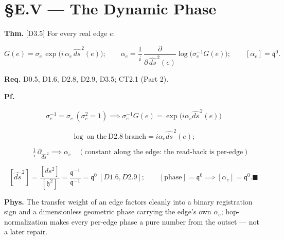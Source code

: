 \section[§E.V — The Dynamic Phase]{\texorpdfstring{§E.V — The Dynamic Phase}{SE.V - The Dynamic Phase}}

\begin{theorem}\label{tag:EM-16}
\textbf{Thm.} [D3.5] For every real edge $e$:

\[
G(e)=\sigma_e\,\exp\!\bigl(i\,\alpha_e\,\widehat{ds}^{\,2}(e)\bigr);\qquad
\alpha_e=\frac1i\,\frac{\partial}{\partial\,\widehat{ds}^{\,2}(e)}\log\!\bigl(\sigma_e^{-1}G(e)\bigr);\qquad
[\alpha_e]=\mathfrak q^{0}.
\]

\textbf{Req.} D0.5, D1.6, D2.8, D2.9, D3.5; CT2.1 (Part 2).

\textbf{Pf.}

\[
\sigma_e^{-1}=\sigma_e\ (\sigma_e^2=1)\implies\sigma_e^{-1}G(e)=\exp\bigl(i\alpha_e\widehat{ds}^{\,2}(e)\bigr)
\]

\[
\log\ \text{on the}\ \mathrm{D2.8}\ \text{branch}=i\alpha_e\widehat{ds}^{\,2}(e);
\]

\[
\qquad \tfrac1i\,\partial_{\widehat{ds}^{\,2}}\implies\alpha_e\quad(\text{constant along the edge: the read-back is per-edge})
\]

\[
[\widehat{ds}^{\,2}]=\frac{[ds^2]}{[\mathfrak h^2]}=\frac{\mathfrak q^{-1}}{\mathfrak q^{-1}}=\mathfrak q^{0}\ [D1.6,D2.9];\qquad[\text{phase}]=\mathfrak q^0\implies[\alpha_e]=\mathfrak q^{0}. \blacksquare
\]

\textbf{Phys.} The transfer weight of an edge factors cleanly into a binary registration sign and a dimensionless geometric phase carrying the edge's own $\alpha_e$; hop-normalization makes every per-edge phase a pure number from the outset — not a later repair.

\end{theorem}

